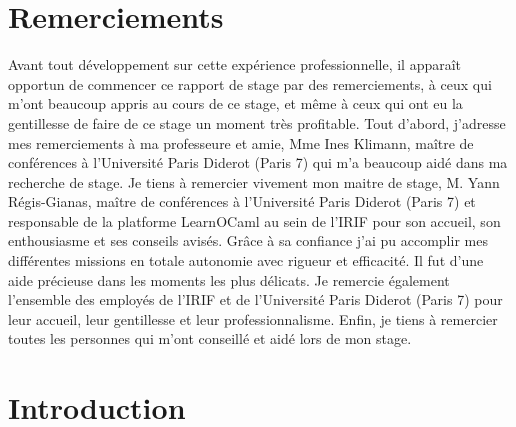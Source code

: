 \documentclass{article}
\begin{document}
\newpage

\tableofcontents
\newpage

\section{Remerciements}
Avant tout développement sur cette expérience professionnelle, il apparaît opportun de commencer ce rapport de stage par des remerciements, à ceux qui m’ont beaucoup appris au cours de ce stage, et même à ceux qui ont eu la gentillesse de faire de ce stage un moment très profitable.
\newline
Tout d'abord, j'adresse mes remerciements à ma professeure et amie, Mme Ines Klimann, maître de conférences à l'Université Paris Diderot (Paris 7) qui m'a beaucoup aidé dans ma recherche de stage.
\newline
Je tiens à remercier vivement mon maitre de stage, M. Yann Régis-Gianas, maître de conférences à l'Université Paris Diderot (Paris 7) et responsable de la platforme LearnOCaml au sein de l'IRIF pour son accueil, son enthousiasme et ses conseils avisés. Grâce à sa confiance j'ai pu accomplir mes différentes missions en totale autonomie avec rigueur et efficacité. Il fut d'une aide précieuse dans les moments les plus délicats.
\newline
Je remercie également l'ensemble des employés de l'IRIF et de l'Université Paris Diderot (Paris 7) pour leur accueil, leur gentillesse et leur professionnalisme.
Enfin, je tiens à remercier toutes les personnes qui m'ont conseillé et aidé lors de mon stage.


\newpage

\section{Introduction}
\end{document}
